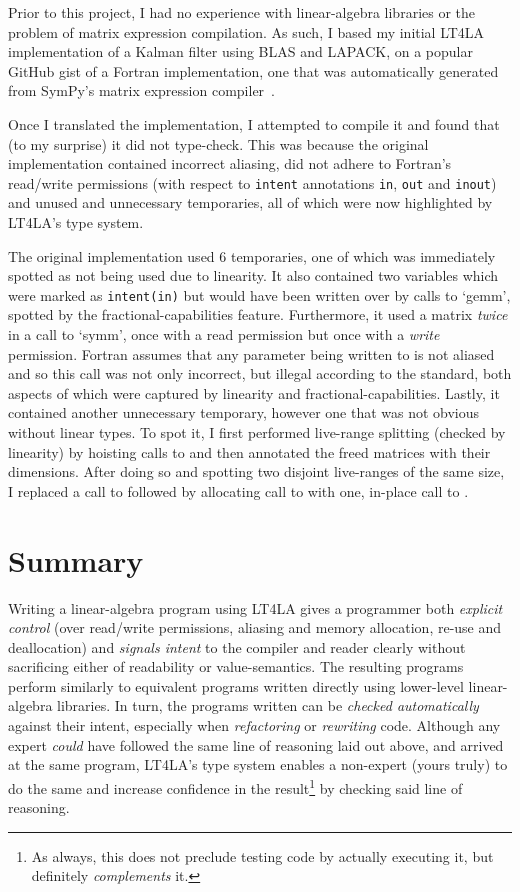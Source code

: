 Prior to this project, I had no experience with linear-algebra libraries or the
problem of matrix expression compilation. As such, I based my initial LT4LA
implementation of a Kalman filter using BLAS and LAPACK, on a popular GitHub
gist of a Fortran implementation, one that was automatically generated from
SymPy's matrix expression compiler~\cite{rocklin_thesis}.

Once I translated the implementation, I attempted to compile it and found that
(to my surprise) it did not type-check. This was because the original
implementation contained incorrect aliasing, did not adhere to Fortran's
read/write permissions (with respect to \texttt{intent} annotations
\texttt{in}, \texttt{out} and \texttt{inout}) and unused and unnecessary
temporaries, all of which were now highlighted by LT4LA's type system.

The original implementation used 6 temporaries, one of which was immediately
spotted as not being used due to linearity. It also contained two variables
which were marked as \texttt{intent(in)} but would have been written over by
calls to `gemm', spotted by the fractional-capabilities feature. Furthermore,
it used a matrix \emph{twice} in a call to `symm', once with a read permission
but once with a \emph{write} permission.  Fortran assumes that any parameter
being written to is not aliased and so this call was not only incorrect, but
illegal according to the standard, both aspects of which were captured by
linearity and fractional-capabilities. Lastly, it contained another unnecessary
temporary, however one that was not obvious without linear types. To spot it, I
first performed live-range splitting (checked by linearity) by hoisting calls
to  and then annotated the freed matrices with their dimensions.
After doing so and spotting two disjoint live-ranges of the same size, I
replaced a call to  followed by allocating call to 
with one, in-place call to .


\section{Summary}

Writing a linear-algebra program using LT4LA gives a programmer both
\emph{explicit control} (over read/write permissions, aliasing and memory
allocation, re-use and deallocation) and \emph{signals intent} to the compiler
and reader clearly without sacrificing either of readability or
value-semantics. The resulting programs perform similarly to equivalent
programs written directly using lower-level linear-algebra libraries. In turn,
the programs written can be \emph{checked automatically} against their intent,
especially when \emph{refactoring} or \emph{rewriting} code. Although any
expert \emph{could} have followed the same line of reasoning laid out above,
and arrived at the same program, LT4LA's type system enables a non-expert
(yours truly) to do the same and increase confidence in the result\footnote{As
always, this does not preclude testing code by actually executing it, but
definitely \emph{complements} it.} by checking said line of reasoning.
